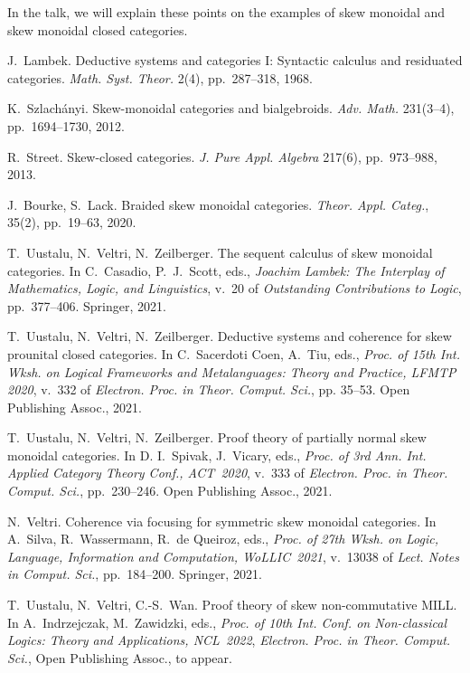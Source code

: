 \documentclass{article}
\begin{document}
In the talk, we will explain these points on the examples of skew
monoidal and skew monoidal closed categories.

\small

\begin{thebibliography}{99}

 J.~Lambek. Deductive systems and categories I: Syntactic
  calculus and residuated categories. \emph{Math. Syst. Theor.} 2(4),
  pp.~287--318, 1968.

 K.~Szlach\'anyi. Skew-monoidal categories and
  bialgebroids. \emph{Adv. Math.} 231(3--4), pp.~1694--1730, 2012.

 R.~Street. Skew-closed categories. \emph{J. Pure
Appl. Algebra} 217(6), pp.~973--988, 2013.

 J.~Bourke, S.~Lack. Braided skew monoidal categories.
\emph{Theor. Appl. Categ.}, 35(2), pp.~19--63, 2020.

 T.~Uustalu, N.~Veltri, N.~Zeilberger. The sequent
  calculus of skew monoidal categories. In C.~Casadio, P.~J.~Scott,
  eds., \emph{Joachim Lambek: The Interplay of Mathematics, Logic, and
  Linguistics}, v.~20 of \emph{Outstanding Contributions to Logic},
  pp.~377--406. Springer, 2021.

 T.~Uustalu, N.~Veltri, N.~Zeilberger. Deductive
  systems and coherence for skew prounital closed categories. \linebreak In
  C.~Sacerdoti Coen, A.~Tiu, eds., \emph{Proc. of 15th Int. Wksh. on
    Logical Frameworks and Metalanguages: Theory and Practice, LFMTP
    2020}, v.~332 of \emph{Electron. Proc. in Theor. Comput. Sci.},
  pp. 35--53. Open Publishing Assoc., 2021.

 T.~Uustalu, N.~Veltri, N.~Zeilberger. Proof theory of
  partially normal skew monoidal categories. In D. I.~Spivak,
  J.~Vicary, eds., \emph{Proc. of 3rd Ann. Int. Applied Category
    Theory Conf., ACT~2020}, v.~333 of \emph{Electron. Proc. in
    Theor. Comput. Sci.}, pp.~230--246. Open Publishing Assoc., 2021.

 N.~Veltri. Coherence via focusing for symmetric skew
  monoidal categories. In A.~Silva, R.~Wassermann, R.~de Queiroz,
  eds., \emph{Proc. of 27th Wksh. on Logic, Language, Information and
    Computation, WoLLIC~2021}, v.~13038 of \emph{Lect. Notes in
    Comput. Sci.}, pp.~184--200. Springer, 2021.

 T.~Uustalu, N.~Veltri, C.-S.~Wan. Proof theory of skew
  non-commutative MILL. In A.~Indrzejczak, \linebreak M.~Zawidzki, eds.,
  \emph{Proc. of 10th Int. Conf. on Non-classical Logics: Theory and
    Applications, NCL~2022}, \emph{Electron. Proc. in
    Theor. Comput. Sci.}, Open Publishing Assoc., to appear.

\end{thebibliography}
\end{document}
